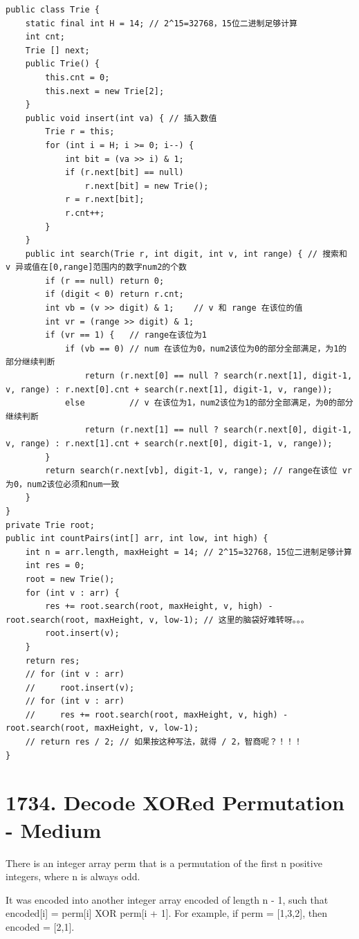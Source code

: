 \documentclass[9pt, b5paaper]{book}
\begin{document}
\begin{verbatim}
public class Trie {
    static final int H = 14; // 2^15=32768，15位二进制足够计算
    int cnt;
    Trie [] next;
    public Trie() {
        this.cnt = 0;
        this.next = new Trie[2];
    }
    public void insert(int va) { // 插入数值
        Trie r = this;
        for (int i = H; i >= 0; i--) {
            int bit = (va >> i) & 1;
            if (r.next[bit] == null)
                r.next[bit] = new Trie();
            r = r.next[bit];
            r.cnt++;
        }
    } 
    public int search(Trie r, int digit, int v, int range) { // 搜索和 v 异或值在[0,range]范围内的数字num2的个数
        if (r == null) return 0;
        if (digit < 0) return r.cnt;
        int vb = (v >> digit) & 1;    // v 和 range 在该位的值
        int vr = (range >> digit) & 1;
        if (vr == 1) {   // range在该位为1
            if (vb == 0) // num 在该位为0，num2该位为0的部分全部满足，为1的部分继续判断
                return (r.next[0] == null ? search(r.next[1], digit-1, v, range) : r.next[0].cnt + search(r.next[1], digit-1, v, range));
            else         // v 在该位为1，num2该位为1的部分全部满足，为0的部分继续判断
                return (r.next[1] == null ? search(r.next[0], digit-1, v, range) : r.next[1].cnt + search(r.next[0], digit-1, v, range));
        }
        return search(r.next[vb], digit-1, v, range); // range在该位 vr 为0，num2该位必须和num一致
    }
}
private Trie root;
public int countPairs(int[] arr, int low, int high) {
    int n = arr.length, maxHeight = 14; // 2^15=32768，15位二进制足够计算
    int res = 0;
    root = new Trie();
    for (int v : arr) {
        res += root.search(root, maxHeight, v, high) - root.search(root, maxHeight, v, low-1); // 这里的脑袋好难转呀。。。
        root.insert(v);
    }
    return res;
    // for (int v : arr) 
    //     root.insert(v);
    // for (int v : arr) 
    //     res += root.search(root, maxHeight, v, high) - root.search(root, maxHeight, v, low-1);
    // return res / 2; // 如果按这种写法，就得 / 2，智商呢？！！！
}
\end{verbatim}

\section{1734. Decode XORed Permutation - Medium}
\label{sec-10-11}
There is an integer array perm that is a permutation of the first n positive integers, where n is always odd.

It was encoded into another integer array encoded of length n - 1, such that encoded[i] = perm[i] XOR perm[i + 1]. For example, if perm = [1,3,2], then encoded = [2,1].
\end{document}
